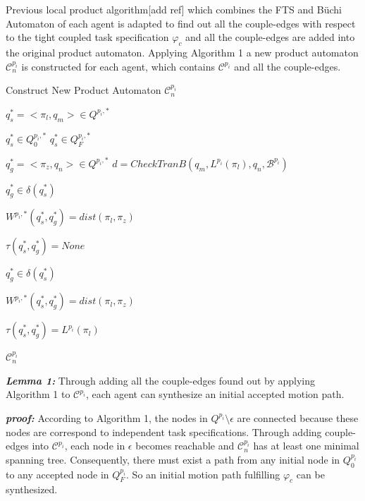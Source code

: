 \documentclass[journal]{IEEEtran}
\begin{document}
Previous local product algorithm[add ref] which combines the FTS and B\"{u}chi Automaton of each agent is adapted to find out all the couple-edges with respect to the tight coupled task specification $\varphi_c$ and all the couple-edges are added into the original product automaton. Applying Algorithm 1 a new product automaton $\mathcal{C}^{p_i}_n$ is constructed for each agent, which contains $\mathcal{C}^{p_i}$ and all the couple-edges.\par
\begin{algorithm}
  \caption{Construct New Product Automaton $\mathcal{C}^{p_i}_n$}
  {
    $q^{\ast}_s=<\pi_l,q_m>\in Q^{p_i,\ast}$

    {
        $q^{\ast}_s\in Q^{p_i,\ast}_0$
    }
    {
        $q^{\ast}_s\in Q^{p_i,\ast}_F$
    }
    {
        $q^{\ast}_g=<\pi_z,q_n>\in Q^{p_i,\ast}$
        $d = CheckTranB(q_m,L^{p_i}(\pi_l),q_n,\mathcal{B}^{p_i})$

        {
            $q^{\ast}_g\in \delta(q^{\ast}_s)$

            $W^{p_i,\ast}(q^{\ast}_s,q^{\ast}_g)=dist(\pi_l,\pi_z)$

            $\tau(q^{\ast}_s,q^{\ast}_g) = None$
        }
        \Else
        {
            {
                $q^{\ast}_g\in \delta(q^{\ast}_s)$

                $W^{p_i,\ast}(q^{\ast}_s,q^{\ast}_g)=dist(\pi_l,\pi_z)$

                $\tau(q^{\ast}_s,q^{\ast}_g)=L^{p_i}(\pi_l)$
            }
        }
    }
  }
  \Return $\mathcal{C}^{p_i}_n$
\end{algorithm}

\textbf{\emph{Lemma 1:}} Through adding all the couple-edges found out by applying Algorithm 1 to $\mathcal{C}^{p_i}$, each agent can synthesize an initial accepted motion path.\par
\textbf{\emph{proof:}} According to Algorithm 1, the nodes in $Q^{p_i} \setminus \epsilon$ are connected because these nodes are correspond to independent task specifications. Through adding couple-edges into $\mathcal{C}^{p_i}$, each node in $\epsilon$ becomes reachable and $\mathcal{C}^{p_i}_n$ has at least one minimal spanning tree. Consequently, there must exist a path from any initial node in $Q_0^{p_i}$ to any accepted node in $Q_F^{p_i}$. So an initial motion path fulfilling $\varphi_c$ can be synthesized.
\end{document}
